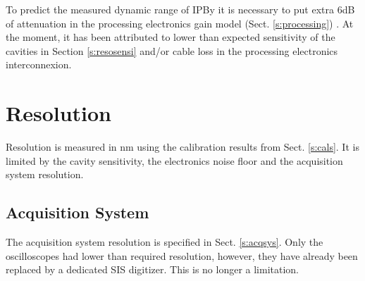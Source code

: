 To predict the measured dynamic range of IPBy it is necessary to put extra 6dB of attenuation in the processing electronics gain model (Sect. \ref{s:processing}) . At the moment, it has been attributed to lower than expected sensitivity of the cavities in Section \ref{s:resosensi} and/or cable loss in the processing electronics interconnexion.\par

\section{Resolution}\label{s:resolution}
Resolution is measured in nm using the calibration results from Sect. \ref{s:cals}. It is limited by the cavity sensitivity, the electronics noise floor and the acquisition system resolution.\par
\subsection{Acquisition System}
The acquisition system resolution is specified in Sect. \ref{s:acqsys}. Only the oscilloscopes had lower than required resolution, however, they have already been replaced by a dedicated SIS digitizer. This is no longer a limitation.\par
